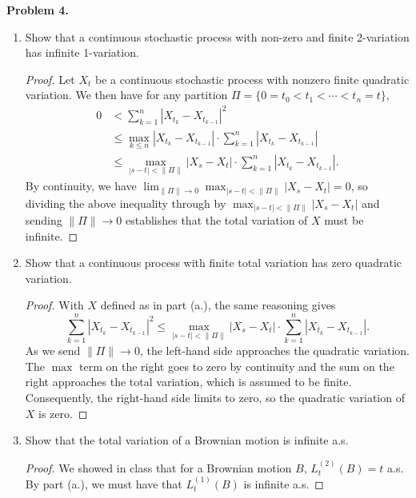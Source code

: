 \documentclass[11pt,letterpaper]{report}
\begin{document}
\noindent\textbf{Problem 4. }
\begin{enumerate}[(a.)]
	\item Show that a continuous stochastic process with non-zero and finite 2-variation has infinite 1-variation.
	\begin{proof}
		Let $X_t$ be a continuous stochastic process with nonzero finite quadratic variation. We then have for any partition $\Pi = \{0 = t_0 < t_1<\cdots < t_n = t\}$,
		\begin{align*}
			0 & < \sum_{k=1}^n|X_{t_k}-X_{t_{k-1}}|^2\\
			&\leq \max_{k \leq n}|X_{t_k}-X_{t_{k-1}}|\cdot \sum_{k=1}^n|X_{t_k}-X_{t_{k-1}}|\\
			&\leq \max_{|s-t|<\|\Pi\|}|X_s-X_t|\cdot \sum_{k=1}^n|X_{t_k}-X_{t_{k-1}}|.
		\end{align*}
		By continuity, we have $\lim_{\|\Pi\|\to 0}\max_{|s-t|<\|\Pi\|}|X_s-X_t| = 0$, so dividing the above inequality through by $\max_{|s-t|<\|\Pi\|}|X_s-X_t|$ and sending $\|\Pi\|\to 0$ establishes that the total variation of $X$ must be infinite.
	\end{proof}

	\item Show that a continuous process with finite total variation has zero quadratic variation.
	\begin{proof}
		With $X$ defined as in part (a.), the same reasoning gives
		\[
		\sum_{k=1}^n|X_{t_k}-X_{t_{k-1}}|^2\leq \max_{|s-t|<\|\Pi\|}|X_s-X_t|\cdot \sum_{k=1}^n|X_{t_k}-X_{t_{k-1}}|.
		\]
		As we send $\|\Pi\|\to 0$, the left-hand side approaches the quadratic variation. The $\max$ term on the right goes to zero by continuity and the sum on the right approaches the total variation, which is assumed to be finite. Consequently, the right-hand side limits to zero, so the quadratic variation of $X$ is zero.
	\end{proof}

	\item Show that the total variation of a Brownian motion is infinite a.s.
	\begin{proof}
		We showed in class that for a Brownian motion $B$, $L_t^{(2)}(B) = t$ a.s. By part (a.), we must have that $L_t^{(1)}(B)$ is infinite a.s.
	\end{proof}
\end{enumerate}
\end{document}
